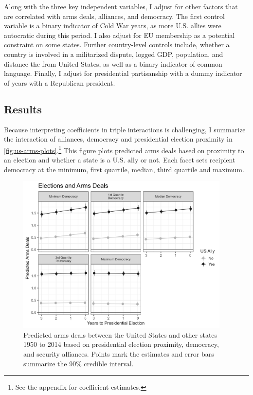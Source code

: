\documentclass[12pt]{article}
\begin{document}
Along with the three key independent variables, I adjust for other factors that are correlated with arms deals, alliances, and democracy. 
The first control variable is a binary indicator of Cold War years, as more U.S. allies were autocratic during this period. 
I also adjust for EU membership as a potential constraint on some states. 
Further country-level controls include, whether a country is involved in a militarized dispute, logged GDP, population, and distance the from United States, as well as a binary indicator of common language. 
Finally, I adjust for presidential partisanship with a dummy indicator of years with a Republican president.  



\subsection{Results}


Because interpreting coefficients in triple interactions is challenging, I summarize the interaction of alliances, democracy and presidential election proximity in \autoref{fig:us-arms-plots}.\footnote{See the appendix for coefficient estimates.}
This figure plots predicted arms deals based on proximity to an election and whether a state is a U.S. ally or not. 
Each facet sets recipient democracy at the minimum, first quartile, median, third quartile and maximum.


\begin{figure}[htpb]
	\centering
		\includegraphics[width=0.95\textwidth]{../figures/us-arms-plots.png}
	\caption{Predicted arms deals between the United States and other states 1950 to 2014 based on presidential election proximity, democracy, and security alliances. Points mark the estimates and error bars summarize the 90\% credible interval.}
	\label{fig:us-arms-plots}
\end{figure}
\end{document}
